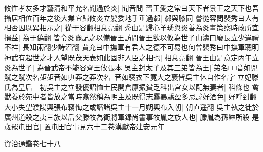 攸性孝友多才藝清和平允名聞過於炎|{
	聞音問}
晉王愛之常曰天下者景王之天下也吾攝居相位百年之後大業宜歸攸炎立髪委地手垂過䣛|{
	䣛與膝同}
嘗從容問裴秀曰人有相否因以異相示之|{
	從干容翻相息亮翻}
秀由是歸心羊琇與炎善為炎畫策察時政所宜損益|{
	為于偽翻}
皆令炎豫記之以備晉王訪問晉王欲以攸為世子山濤曰廢長立少違禮不祥|{
	長知兩翻少詩沼翻}
賈充曰中撫軍有君人之德不可易也何曾裴秀曰中撫軍聰明神武有超世之才人望既茂天表如此固非人臣之相也|{
	相息亮翻}
晉王由是意定丙午立炎為世子|{
	為晉武帝不能容齊王攸張本}
吳主封太子及其三弟皆為王|{
	弟名□□音如兕觥之觥次名壾壾音如屮莽之莽次名音如襃衣下寛大之褎皆吳主休自作名字}
立妃滕氏為皇后　初吳主之立發優詔恤士民開倉廪振貧乏科出宫女以配無妻者|{
	科條也}
禽獸養於苑中者皆放之當時翕然稱為明主及既得志麤暴驕盈多忌諱好酒色|{
	好呼到翻}
大小失望濮陽興張布竊悔之或譖諸吳主十一月朔興布入朝|{
	朝直遥翻}
吳主執之徙於廣州道殺之夷三族以后父滕牧為衛將軍録尚書事牧胤之族人也|{
	滕胤為孫綝所殺}
是歲罷屯田官|{
	置屯田官事見六十二卷漢獻帝建安元年}


資治通鑑卷七十八

